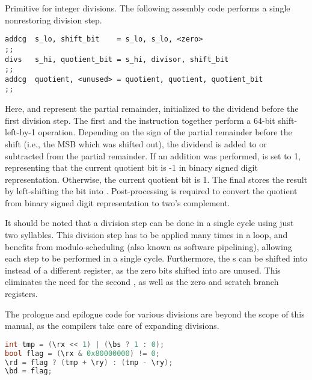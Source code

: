 Primitive for integer divisions. The following assembly code performs a single 
nonrestoring division step.

\begin{lstlisting}[numbers=none, basicstyle=\ttfamily\footnotesize, language=vexasm]
addcg  s_lo, shift_bit    = s_lo, s_lo, <zero>
;;
divs   s_hi, quotient_bit = s_hi, divisor, shift_bit
;;
addcg  quotient, <unused> = quotient, quotient, quotient_bit
;;
\end{lstlisting}

\noindent Here,  and  represent the partial remainder,
initialized to the dividend before the first division step. The first
 and the  instruction together perform a 64-bit
shift-left-by-1 operation. Depending on the sign of the partial remainder before
the shift (i.e., the MSB which was shifted out), the dividend is added to or
subtracted from the partial remainder. If an addition was performed,
 is set to 1, representing that the current quotient bit is
-1 in binary signed digit representation. Otherwise, the current quotient bit is
1. The final  stores the result by left-shifting the bit into
. Post-processing is required to convert the quotient from binary
signed digit representation to two's complement.

It should be noted that a division step can be done in a single cycle using just 
two syllables. This division step has to be applied many times in a loop, and 
benefits from modulo-scheduling (also known as software pipelining), allowing 
each step to be performed in a single cycle. Furthermore, the
s can be shifted into  instead of a different
register, as the zero bits shifted into  are unused. This eliminates
the need for the second , as well as the zero and scratch branch
registers.

The prologue and epilogue code for various divisions are beyond the scope of
this manual, as the compilers take care of expanding divisions.

\begin{lstlisting}[numbers=none, basicstyle=\ttfamily\footnotesize, language=C++]
int tmp = (\rx << 1) | (\bs ? 1 : 0);
bool flag = (\rx & 0x80000000) != 0;
\rd = flag ? (tmp + \ry) : (tmp - \ry);
\bd = flag;
\end{lstlisting}
